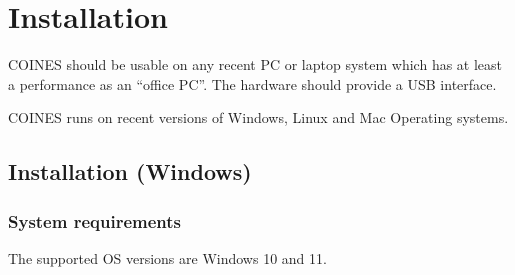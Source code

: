 \documentclass{article}
\begin{document}
\section{Installation}

COINES should be usable on any recent PC or laptop system which has at least a performance as an “office PC”. The hardware should provide a USB interface.

COINES runs on recent versions of Windows, Linux and Mac Operating systems.

\subsection{Installation (Windows)}

\subsubsection{System requirements}
The supported OS versions are Windows 10 and 11.
\end{document}
